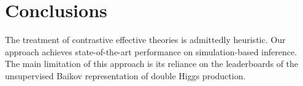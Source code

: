 \section{Conclusions}\label{sec:conclusions}

The treatment of contrastive effective theories is admittedly heuristic.
Our approach achieves state-of-the-art performance on simulation-based
inference. The main limitation of this approach is its reliance on the
leaderboards of the unsupervised Baikov representation of double Higgs
production.

